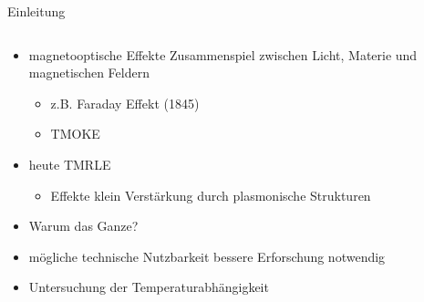 \begin{frame}{Einleitung}
    \pause
    \begin{columns}
        \begin{column}{0.5\textwidth}
            \begin{itemize}
                \item <1-> magnetooptische Effekte \leftrightarrow Zusammenspiel zwischen Licht, Materie und magnetischen Feldern
                    \begin{itemize}
                        \item <2-> z.B. Faraday Effekt (1845)
                        \item <3-> TMOKE
                    \end{itemize}
                \bigskip 
                \item <4-> heute \rightarrow TMRLE 
                    \begin{itemize}
                        \item <5-> Effekte klein \rightarrow Verstärkung durch plasmonische Strukturen
                    \end{itemize}
                \bigskip 
                \item <6-> Warum das Ganze?
                \item <7-> mögliche technische Nutzbarkeit \rightarrow bessere Erforschung notwendig 
                \item <8-> Untersuchung der Temperaturabhängigkeit    
            \end{itemize}
        \end{column}
        \begin{column}{0.5\textwidth}
            \centering
        \end{column}
    \end{columns}
\end{frame}